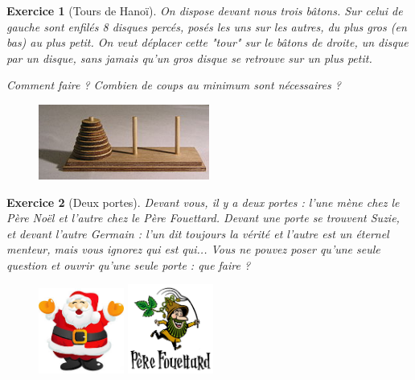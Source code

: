 \documentclass[12pt]{article}
\theoremstyle{break}
\newtheorem{exo}{Exercice}
\begin{document}
\begin{exo}[Tours de Hanoï]
On dispose devant nous trois bâtons. Sur celui de gauche sont enfilés 8 disques percés, posés les uns sur les autres, du plus gros (en bas) au plus petit. On veut déplacer cette "tour" sur le bâtons de droite, un disque par un disque, sans jamais qu'un gros disque se retrouve sur un plus petit.

Comment faire ? Combien de coups au minimum sont nécessaires ?

\begin{figure}[h!]
	\centering
    \includegraphics[width=0.5\textwidth]{images/TourDeHanoi.jpeg}
\end{figure}
\end{exo}


\begin{exo}[Deux portes]
Devant vous, il y a deux portes : l'une mène chez le Père Noël et l'autre chez le Père Fouettard. Devant une porte se trouvent Suzie, et devant l'autre Germain : l'un dit toujours la vérité et l'autre est un éternel menteur, mais vous ignorez qui est qui... Vous ne pouvez poser qu'une seule question et ouvrir qu'une seule porte : que faire ?

\begin{figure}[h!]
	\centering
    \includegraphics[width=0.25\textwidth]{images/PereNoel.jpg}
    \includegraphics[width=0.25\textwidth]{images/PereFouettard.png}
\end{figure}
\end{exo}
\end{document}
